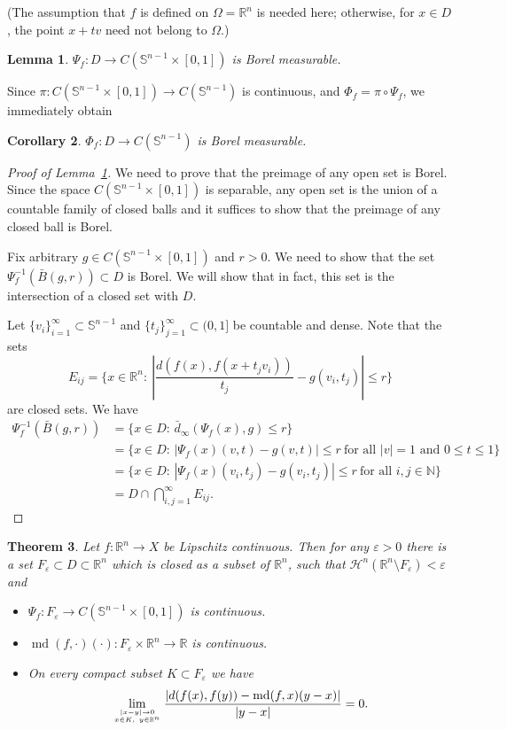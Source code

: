 \documentclass[12pt,leqno]{amsart}
\newtheorem{theorem}{Theorem}
\newtheorem{lemma}[theorem]{Lemma}
\newtheorem{corollary}[theorem]{Corollary}
\theoremstyle{definition}
\newcommand{\bbbn}{\mathbb N}
\newcommand{\bbbr}{\mathbb R}
\newcommand{\Sph}{\mathbb S}
\newcommand{\eps}{\varepsilon}
\def\H{{\mathcal H}}
\def\md{\operatorname{md}}
\newcommand\mycom[2]{\genfrac{}{}{0pt}{}{#1}{#2}}
\numberwithin{theorem}{section} \numberwithin{equation}{section}
\begin{document}
(The assumption that $f$ is defined on $\Omega=\bbbr^n$ is needed here; otherwise, for $x\in D$, the point $x+tv$ need not belong to $\Omega$.)

\begin{lemma}
\label{T9}
$\Psi_f:D\to C(\Sph^{n-1}\times [0,1])$ is Borel measurable.
\end{lemma}
Since $\pi:C(\Sph^{n-1}\times [0,1])\to C(\Sph^{n-1})$ is continuous, and $\Phi_f=\pi\circ\Psi_f$, we immediately obtain
\begin{corollary}
\label{T10}
$\Phi_f:D\to C(\Sph^{n-1})$ is Borel measurable.
\end{corollary}

\begin{proof}[Proof of Lemma~\ref{T9}]
We need to prove that the preimage of any open set is Borel.
Since the space $C(\Sph^{n-1}\times [0,1])$ is separable, any open set is the union of a countable family of closed balls and it suffices to show that the preimage of any closed ball is Borel.

Fix arbitrary $g\in C(\Sph^{n-1}\times [0,1])$ and $r>0$. We need to show that the set
$\Psi_f^{-1}(\bar{B}(g,r))\subset D$ is Borel. We will show that in fact, this set is the intersection of a closed set with $D$.

Let $\{v_i\}_{i=1}^\infty\subset\Sph^{n-1}$ and $\{ t_j\}_{j=1}^\infty\subset (0,1]$ be countable and dense. Note that the sets
$$
E_{ij} =\Big\{x\in\bbbr^n:\ \left|\frac{d(f(x),f(x+t_jv_i))}{t_j}-g(v_i,t_j)\right|\leq r\Big\}
$$
are closed sets. We have
\begin{equation*}
\begin{split}
\Psi_f^{-1}(\bar{B}(g,r))
&=
\{x\in D:\, \bar{d}_\infty(\Psi_f(x),g)\leq r\}\\
&=
\{x\in D:\, |\Psi_f(x)(v,t)-g(v,t)|\leq r\  \text{for all $|v|=1$ and $0\leq t\leq 1$}\}\\
&=
\{x\in D:\, |\Psi_f(x)(v_i,t_j)-g(v_i,t_j)|\leq r\  \text{for all $i,j\in\bbbn$}\}\\
&=
D\cap\bigcap_{i,j=1}^\infty E_{ij}.
\end{split}
\end{equation*}
\end{proof}
\begin{theorem}
\label{T11}
Let $f:\bbbr^n\to X$ be Lipschitz continuous. Then for any $\eps>0$ there is a set $F_\eps\subset D\subset\bbbr^n$ which is closed as a subset of $\bbbr^n$, such that $\H^n(\bbbr^n\setminus F_\eps)<\eps$ and
\begin{itemize}
\item[(a)]
$\Psi_f:F_\eps\to C(\Sph^{n-1}\times [0,1])$ is continuous.
\item[(b)]
$\md(f,\cdot)(\cdot):F_\eps\times\bbbr^n\to\bbbr$ is continuous.
\item[(c)]
On every compact subset $K\subset F_\eps$ we have
\begin{equation}
\label{Eq13}
\lim_{\mycom{|x-y|\to 0}{x\in K,\ y\in\bbbr^n}}
\frac{|d(f(x),f(y))-\md(f,x)(y-x)|}{|y-x|}=0.
\end{equation}
\end{itemize}
\end{theorem}
\end{document}

